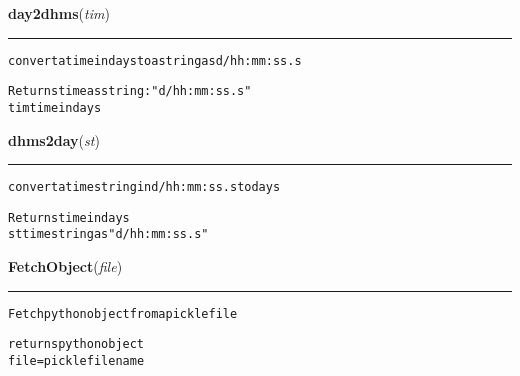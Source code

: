     \label{VLBACal:day2dhms}
    \vspace{0.5ex}

    \begin{boxedminipage}{\textwidth}

    \raggedright \textbf{day2dhms}(\textit{tim})

    \vspace{-1.5ex}

    \rule{\textwidth}{0.5\fboxrule}
\begin{alltt}
convert a time in days to a string as d/hh:mm:ss.s

Returns time as string:  "d/hh:mm:ss.s"
tim       time in days\end{alltt}

    \vspace{1ex}

    \end{boxedminipage}

    \label{VLBACal:dhms2day}
    \vspace{0.5ex}

    \begin{boxedminipage}{\textwidth}

    \raggedright \textbf{dhms2day}(\textit{st})

    \vspace{-1.5ex}

    \rule{\textwidth}{0.5\fboxrule}
\begin{alltt}
convert a time string in d/hh:mm:ss.s to days

Returns time in days
st        time string as "d/hh:mm:ss.s"\end{alltt}

    \vspace{1ex}

    \end{boxedminipage}

    \label{VLBACal:FetchObject}
    \vspace{0.5ex}

    \begin{boxedminipage}{\textwidth}

    \raggedright \textbf{FetchObject}(\textit{file})

    \vspace{-1.5ex}

    \rule{\textwidth}{0.5\fboxrule}
\begin{alltt}
Fetch python object from a pickle file

returns python object
file     = pickle file name\end{alltt}

    \vspace{1ex}

    \end{boxedminipage}

